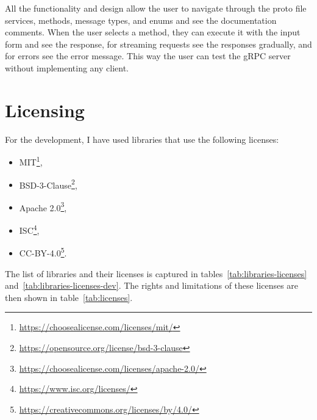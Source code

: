 All the functionality and design allow the user to navigate through the proto file services, methods, message types, and enums and see the documentation comments.
When the user selects a method, they can execute it with the input form and see the response, for streaming requests see the responses gradually, and for errors see the error message.
This way the user can test the gRPC server without implementing any client.


\section{Licensing}
For the development, I have used libraries that use the following licenses:
\begin{itemize}
    \item MIT\footnote{\url{https://choosealicense.com/licenses/mit/}},
    \item BSD-3-Clause\footnote{\url{https://opensource.org/license/bsd-3-clause}},
    \item Apache 2.0\footnote{\url{https://choosealicense.com/licenses/apache-2.0/}},
    \item ISC\footnote{\url{https://www.isc.org/licenses/}},
    \item CC-BY-4.0\footnote{\url{https://creativecommons.org/licenses/by/4.0/}}.
\end{itemize}

The list of libraries and their licenses is captured in tables~\ref{tab:libraries-licenses} and~\ref{tab:libraries-licenses-dev}.
The rights and limitations of these licenses are then shown in table~\ref{tab:licenses}.

